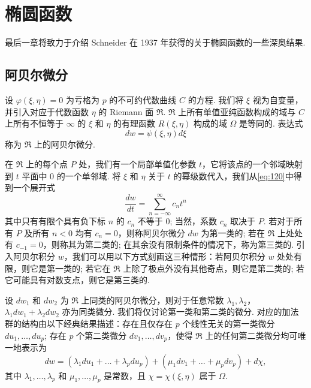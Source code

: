 \chapter{椭圆函数}\label{sec:chapter4}

最后一章将致力于介绍 Schneider 在 1937 年获得的关于椭圆函数的一些深奥结果.

\section{阿贝尔微分}\label{sec:4.1}

设 $\varphi(\xi, \eta) = 0$ 为亏格为 $p$ 的不可约代数曲线 $C$ 的方程. 我们将 $\xi$ 视为自变量，并引入对应于代数函数 $\eta$ 的 Riemann 面 $\mathfrak{R}$. $\mathfrak{R}$ 上所有单值亚纯函数构成的域与 $C$ 上所有不恒等于 $\infty$ 的 $\xi$ 和 $\eta$ 的有理函数 $R(\xi, \eta)$ 构成的域 $\Omega$ 是等同的. 表达式
\begin{equation}
dw = \psi(\xi, \eta) d\xi \tag{120}\label{eq:120}
\end{equation}
称为 $\mathfrak{R}$ 上的阿贝尔微分.

在 $\mathfrak{R}$ 上的每个点 $P$ 处，我们有一个局部单值化参数 $t$，它将该点的一个邻域映射到 $t$ 平面中 $0$ 的一个单邻域. 将 $\xi$ 和 $\eta$ 关于 $t$ 的幂级数代入，我们从\eqref{eq:120}中得到一个展开式
\[
\frac{dw}{dt} = \sum_{n=-\infty}^{\infty} c_n t^n
\]
其中只有有限个具有负下标 $n$ 的 $c_n$ 不等于 $0$; 当然，系数 $c_n$ 取决于 $P$. 若对于所有 $P$ 及所有 $n < 0$ 均有 $c_n = 0$，则称阿贝尔微分 $dw$ 为第一类的; 若在 $\mathfrak{R}$ 上处处有 $c_{-1} = 0$，则称其为第二类的; 在其余没有限制条件的情况下，称为第三类的. 引入阿贝尔积分 $w$，我们可以用以下方式刻画这三种情形：若阿贝尔积分 $w$ 处处有限，则它是第一类的; 若它在 $\mathfrak{R}$ 上除了极点外没有其他奇点，则它是第二类的; 若它可能具有对数支点，则它是第三类的.

设 $dw_1$ 和 $dw_2$ 为 $\mathfrak{R}$ 上同类的阿贝尔微分，则对于任意常数 $\lambda_1, \lambda_2$，$\lambda_1 dw_1 + \lambda_2 dw_2$ 亦为同类微分. 我们将仅讨论第一类和第二类的微分. 对应的加法群的结构由以下经典结果描述：存在且仅存在 $p$ 个线性无关的第一类微分 $du_1, \dots, du_p$; 存在 $p$ 个第二类微分 $dv_1, \dots, dv_p$，使得 $\mathfrak{R}$ 上的任何第二类微分均可唯一地表示为
\begin{equation}
dw = (\lambda_1 du_1 + \dots + \lambda_p du_p) + (\mu_1 dv_1 + \dots + \mu_p dv_p) + d\chi, \tag{121}\label{eq:121}
\end{equation}
其中 $\lambda_1, \dots, \lambda_p$ 和 $\mu_1, \dots, \mu_p$ 是常数，且 $\chi = \chi(\xi, \eta)$ 属于 $\Omega$.

